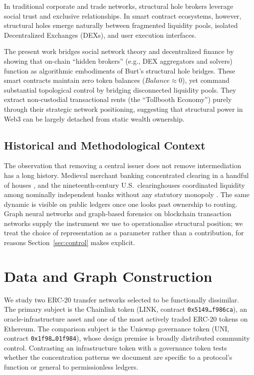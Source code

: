\documentclass[final,5p,times]{elsarticle}
\begin{document}
In traditional corporate and trade networks, structural hole brokers leverage social trust and exclusive relationships. In smart contract ecosystems, however, structural holes emerge naturally between fragmented liquidity pools, isolated Decentralized Exchanges (DEXs), and user execution interfaces.

The present work bridges social network theory and decentralized finance by showing that on-chain ``hidden brokers'' (e.g., DEX aggregators and solvers) function as algorithmic embodiments of Burt's structural hole bridges. These smart contracts maintain zero token balances ($Balance \approx 0$), yet command substantial topological control by bridging disconnected liquidity pools. They extract non-custodial transactional rents (the ``Tollbooth Economy'') purely through their strategic network positioning, suggesting that structural power in Web3 can be largely detached from static wealth ownership.

\subsection{Historical and Methodological Context}
The observation that removing a central issuer does not remove
intermediation has a long history. Medieval merchant banking concentrated
clearing in a handful of houses \cite{deroover1948medici}, and the
nineteenth-century U.S.\ clearinghouses coordinated liquidity among nominally
independent banks without any statutory monopoly \cite{gorton1987joint,
kindleberger2011manias}. The same dynamic is visible on public ledgers once
one looks past ownership to routing. Graph neural networks \cite{kipf2017semi,hamilton2017inductive}
and graph-based forensics on blockchain transaction networks
\cite{weber2019anti} supply the instrument we use to operationalise
structural position; we treat the choice of representation as a parameter
rather than a contribution, for reasons Section~\ref{sec:control} makes
explicit.

\section{Data and Graph Construction}
\label{sec:data}

We study two ERC-20 transfer networks selected to be functionally
dissimilar. The primary subject is the Chainlink token (LINK, contract
\texttt{0x5149\ldots f986ca}), an oracle-infrastructure asset and one of the
most actively traded ERC-20 tokens on Ethereum. The comparison subject is
the Uniswap governance token (UNI, contract
\texttt{0x1f98\ldots 01f984}), whose design premise is broadly distributed
community control. Contrasting an infrastructure token with a governance
token tests whether the concentration patterns we document are specific to
a protocol's function or general to permissionless ledgers.
\end{document}
